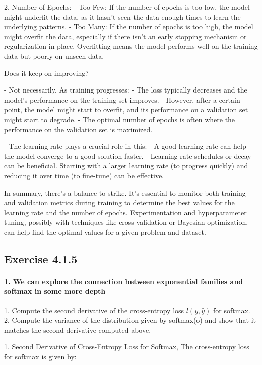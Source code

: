 2. Number of Epochs:
   - Too Few: If the number of epochs is too low, the model might underfit the data, as it hasn't seen the data enough times to learn the underlying patterns.
   - Too Many: If the number of epochs is too high, the model might overfit the data, especially if there isn't an early stopping mechanism or regularization in place. Overfitting means the model performs well on the training data but poorly on unseen data.

Does it keep on improving?

- Not necessarily. As training progresses:
  - The loss typically decreases and the model's performance on the training set improves.
  - However, after a certain point, the model might start to overfit, and its performance on a validation set might start to degrade.
  - The optimal number of epochs is often where the performance on the validation set is maximized.

- The learning rate plays a crucial role in this:
  - A good learning rate can help the model converge to a good solution faster.
  - Learning rate schedules or decay can be beneficial. Starting with a larger learning rate (to progress quickly) and reducing it over time (to fine-tune) can be effective.

In summary, there's a balance to strike.
It's essential to monitor both training and validation metrics during training to determine the best values for the learning rate and the number of epochs.
Experimentation and hyperparameter tuning, possibly with techniques like cross-validation or Bayesian optimization, can help find the optimal values for a given problem and dataset.


\subsection{Exercise 4.1.5}

\paragraph{1. We can explore the connection between exponential families and softmax in some more depth}

1. Compute the second derivative of the cross-entropy loss \(l(y, \hat{y})\) for softmax.
2. Compute the variance of the distribution given by softmax(o) and show that it matches the second derivative computed above.

1. Second Derivative of Cross-Entropy Loss for Softmax, The cross-entropy loss for softmax is given by:

